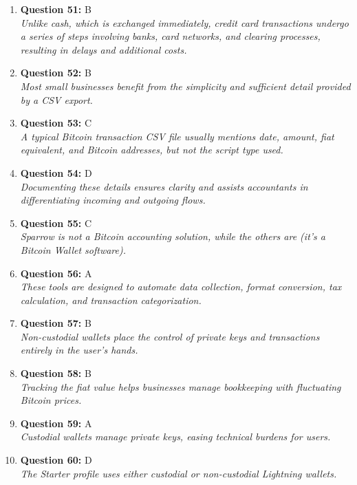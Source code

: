 \documentclass[12pt,a4paper]{article}
\begin{document}
\begin{enumerate}
\item \textbf{Question 51:} B
\\ \textit{Unlike cash, which is exchanged immediately, credit card transactions undergo a series of steps involving banks, card networks, and clearing processes, resulting in delays and additional costs.}

\item \textbf{Question 52:} B
\\ \textit{Most small businesses benefit from the simplicity and sufficient detail provided by a CSV export.}

\item \textbf{Question 53:} C
\\ \textit{A typical Bitcoin transaction CSV file usually mentions date, amount, fiat equivalent, and Bitcoin addresses, but not the script type used.}

\item \textbf{Question 54:} D
\\ \textit{Documenting these details ensures clarity and assists accountants in differentiating incoming and outgoing flows.}

\item \textbf{Question 55:} C
\\ \textit{Sparrow is not a Bitcoin accounting solution, while the others are (it's a Bitcoin Wallet software).}

\item \textbf{Question 56:} A
\\ \textit{These tools are designed to automate data collection, format conversion, tax calculation, and transaction categorization.}

\item \textbf{Question 57:} B
\\ \textit{Non-custodial wallets place the control of private keys and transactions entirely in the user's hands.}

\item \textbf{Question 58:} B
\\ \textit{Tracking the fiat value helps businesses manage bookkeeping with fluctuating Bitcoin prices.}

\item \textbf{Question 59:} A
\\ \textit{Custodial wallets manage private keys, easing technical burdens for users.}

\item \textbf{Question 60:} D
\\ \textit{The Starter profile uses either custodial or non-custodial Lightning wallets.}


\end{enumerate}
\end{document}
